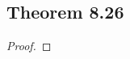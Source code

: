 \documentclass[../../main.tex]{subfiles}
\begin{document}
\subsection{Theorem 8.26}
\begin{wts}

\end{wts}
\begin{proof}

\end{proof}
\end{document}
